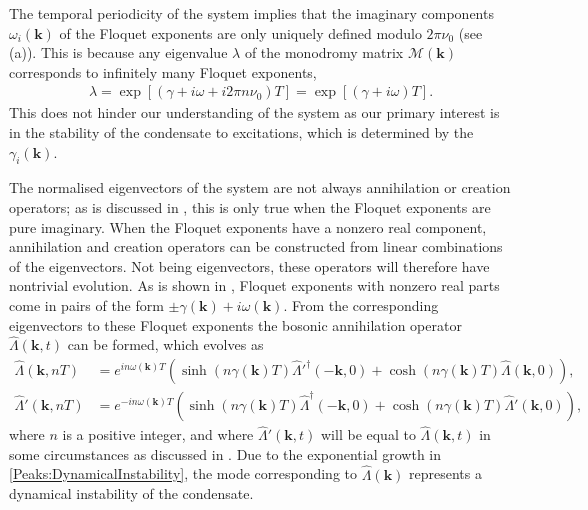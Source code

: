 The temporal periodicity of the system implies that the imaginary components $\omega_i(\bm{k})$ of the Floquet exponents are only uniquely defined modulo $2\pi \nu_0$ (see (a)). This is because any eigenvalue $\lambda$ of the monodromy matrix $\mathcal{M}(\bm{k})$ corresponds to infinitely many Floquet exponents,
\begin{align}
    \label{Peaks:AmbiguityFloquetExponent}
    \lambda = \exp\left[\left(\gamma + i\omega + i 2 \pi n \nu_0\right)T\right] = \exp\left[\left(\gamma + i \omega\right)T\right].
\end{align}
This does not hinder our understanding of the system as our primary interest is in the stability of the condensate to excitations, which is determined by the $\gamma_i(\bm{k})$.

The normalised eigenvectors of the system are not always annihilation or creation operators; as is discussed in , this is only true when the Floquet exponents are pure imaginary. When the Floquet exponents have a nonzero real component, annihilation and creation operators can be constructed from linear combinations of the eigenvectors. Not being eigenvectors, these operators will therefore have nontrivial evolution. As is shown in , Floquet exponents with nonzero real parts come in pairs of the form $\pm \gamma(\bm{k}) + i \omega(\bm{k})$. From the corresponding eigenvectors to these Floquet exponents the bosonic annihilation operator $\hat{\Lambda}(\bm{k}, t)$ can be formed, which evolves as
\begin{subequations}
    \label{Peaks:DynamicalInstability}
    \begin{align}
        \hat{\Lambda}(\bm{k}, nT) &= e^{i n\omega(\bm{k}) T} \left( \sinh(n\gamma(\bm{k}) T) \hat{\Lambda}'^\dagger(-\bm{k}, 0) + \cosh(n\gamma(\bm{k}) T) \hat{\Lambda}(\bm{k}, 0)\right),\\
        \hat{\Lambda}'(\bm{k}, nT) &= e^{-i n \omega(\bm{k}) T} \left( \sinh(n\gamma(\bm{k}) T) \hat{\Lambda}^\dagger(-\bm{k}, 0) + \cosh(n\gamma(\bm{k}) T) \hat{\Lambda}'(\bm{k}, 0)\right),
    \end{align}
\end{subequations}
where $n$ is a positive integer, and where $\hat{\Lambda}'(\bm{k}, t)$ will be equal to $\hat{\Lambda}(\bm{k}, t)$ in some circumstances as discussed in . Due to the exponential growth in \eqref{Peaks:DynamicalInstability}, the mode corresponding to $\hat{\Lambda}(\bm{k})$ represents a dynamical instability of the condensate.

